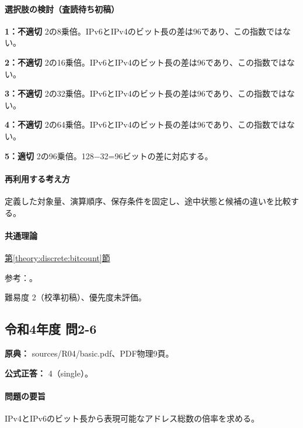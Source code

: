 \paragraph{選択肢の検討（査読待ち初稿）}\mbox{}\par

\noindent\textbf{1：不適切} 2の8乗倍。IPv6とIPv4のビット長の差は96であり、この指数ではない。\par

\noindent\textbf{2：不適切} 2の16乗倍。IPv6とIPv4のビット長の差は96であり、この指数ではない。\par

\noindent\textbf{3：不適切} 2の32乗倍。IPv6とIPv4のビット長の差は96であり、この指数ではない。\par

\noindent\textbf{4：不適切} 2の64乗倍。IPv6とIPv4のビット長の差は96であり、この指数ではない。\par

\noindent\textbf{5：適切} 2の96乗倍。128−32=\allowbreak{}96ビットの差に対応する。\par

\paragraph{再利用する考え方} 定義した対象量、演算順序、保存条件を固定し、途中状態と候補の違いを比較する。

\paragraph{共通理論} \hyperref[theory:discrete:bitcount]{第\ref*{theory:discrete:bitcount}節}

\par 参考：\cite{rfc4291_addresses}。

\par 難易度 2（校準初稿）、優先度未評価。

\subsection{令和4年度 問2-6}
\label{q:r04-reg-basic-2-6}

\noindent\textbf{原典：} sources/R04/basic.pdf、PDF物理9頁。

\textbf{公式正答：} 4（single）。

\paragraph{問題の要旨} IPv4とIPv6のビット長から表現可能なアドレス総数の倍率を求める。

